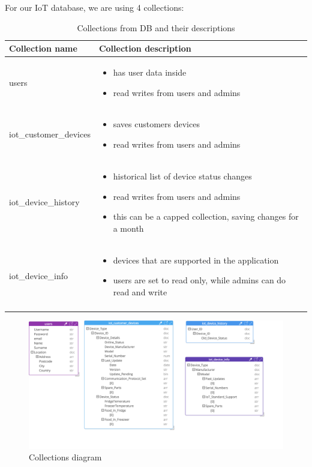 For our IoT database, we are using 4 collections:
\begin{center}
\begin{longtable}{ |m{4cm}|m{9cm}| } 
 \hline
 Collection name & Collection description \\ 
 \hline
  users & 
  \begin{itemize}
    \item has user data inside
    \item read writes from users and admins
  \end{itemize} \\ 
  \hline
  iot{\_}customer{\_}devices & 
  \begin{itemize}
    \item saves customers devices
    \item read writes from users and admins
  \end{itemize} \\ 
   \hline
  iot{\_}device{\_}history & 
  \begin{itemize}
    \item historical list of device status changes
    \item read writes from users and admins
    \item this can be a capped collection, saving changes for a month
  \end{itemize} \\ 
   \hline
  iot{\_}device{\_}info & 
  \begin{itemize}
    \item devices that are supported in the application
    \item users are set to read only, while admins can do read and write
  \end{itemize} \\ 
 \hline
\caption{Collections from DB and their descriptions}
\end{longtable}
\end{center}


\begin{figure}[H]
\includegraphics[scale=0.22]{img/IoT_Model_diagram.jpg}
\centering
\caption{Collections diagram}
\end{figure}

